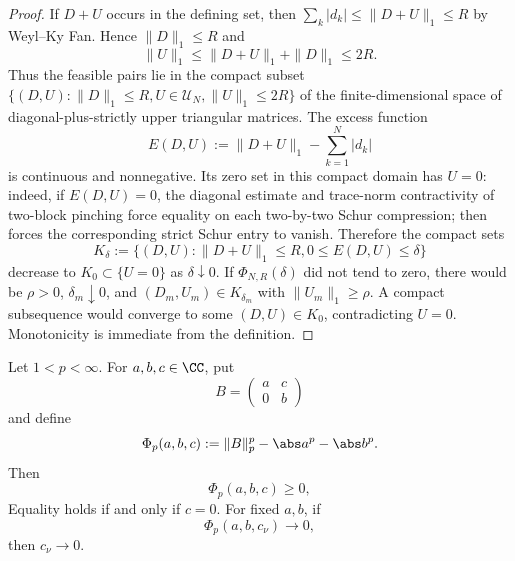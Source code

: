 \begin{proof}
  If \(D+U\) occurs in the defining set, then
  \(\sum_k|d_k|\le\|D+U\|_1\le R\) by Weyl--Ky Fan. Hence
  \(\|D\|_1\le R\) and
  \[
    \|U\|_1\le \|D+U\|_1+\|D\|_1
    \le 2R.
  \]
  Thus the feasible pairs lie in the compact subset
  \(\{(D,U):\|D\|_1\le R,
  U\in\mathcal U_N,
  \|U\|_1\le2R\}\) of the finite-dimensional space of diagonal-plus-strictly
  upper triangular matrices.  The excess function
  \[
    E(D,U):=\|D+U\|_1-\sum_{k=1}^N|d_k|
  \]
  is continuous and nonnegative.  Its zero set in this compact domain has
  \(U=0\): indeed, if \(E(D,U)=0\), the diagonal estimate and trace-norm
  contractivity of two-block pinching force equality on each two-by-two Schur
  compression; then  forces the
  corresponding strict Schur entry to vanish.  Therefore the compact sets
  \[
    K_\delta:=\{(D,U):\|D+U\|_1\le R,
    0\le E(D,U)\le\delta\}
  \]
  decrease to \(K_0\subset\{U=0\}\) as \(\delta\downarrow0\).  If
  \(\Phi_{N,R}(\delta)\) did not tend to zero, there would be
  \(\rho>0\), \(\delta_m\downarrow0\), and \((D_m,U_m)\in K_{\delta_m}\)
  with \(\|U_m\|_1\ge\rho\).  A compact subsequence would converge to some
  \((D,U)\in K_0\), contradicting \(U=0\).  Monotonicity is immediate from
  the definition.
\end{proof}

\begin{lemma}
  \label{lem:two-by-two-schatten-pinching}
  Let \(1<p<\infty\). For \(a,b,c\in\CC\), put
  \[
    B=\begin{pmatrix}a&c\\0&b\end{pmatrix}
  \]
  and define
  \[
    \Phi_p(a,b,c):=\|B\|_p^p-\abs a^p-\abs b^p .
  \]
  Then
  \[
    \Phi_p(a,b,c)\ge0,
  \]
  Equality holds if and only if \(c=0\). For fixed \(a,b\), if
  \[
    \Phi_p(a,b,c_\nu)\longrightarrow0,
  \]
  then \(c_\nu\to0\).
\end{lemma}

